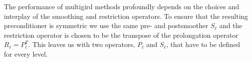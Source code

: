 


The performance of multigird methods profoundly depends on the choices and
interplay of the smoothing and restriction operators. To ensure that the
resulting preconditioner is symmetric we use the same pre- and postsmoother
$S_\ell$ and the restriction operator is chosen to be the transpose of the
prolongation operator $R_\ell = P_\ell^T$. This leaves us with two operators,
$P_\ell$ and $S_\ell$, that have to be defined for every level.



